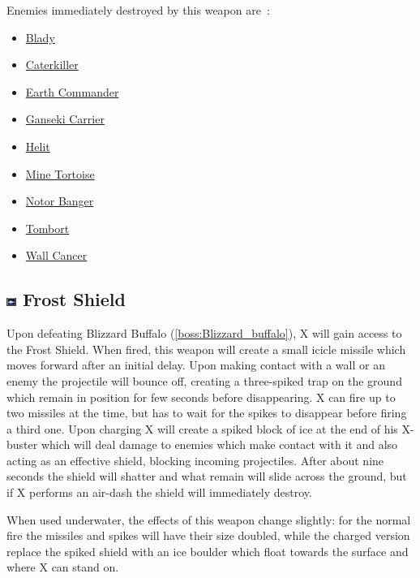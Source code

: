 Enemies immediately destroyed by this weapon are~\cite{wiki:damage_chart_X3}:
\begin{itemize}
	\item \hyperlink{enem:Blady}{Blady}
	\item \hyperlink{enem:Caterkiller}{Caterkiller}
	\item \hyperlink{enem:Earth_Commander}{Earth Commander}
	\item \hyperlink{enem:Ganseki_Carrier}{Ganseki Carrier}
	\item \hyperlink{enem:Helit}{Helit}
	\item \hyperlink{enem:Mine_Tortoise}{Mine Tortoise}
	\item \hyperlink{enem:Notor_Banger}{Notor Banger}
	\item \hyperlink{enem:Tombort}{Tombort}
	\item \hyperlink{enem:Wall_Cancer}{Wall Cancer}
\end{itemize}
\subsection{\includegraphics[width=12px, height=10px]{figures/X3/weapons/F_shield.jpg} Frost Shield}\label{Frost_Shield}
Upon defeating Blizzard Buffalo (\ref{boss:Blizzard_buffalo}), X will gain access to the Frost Shield. When fired, this weapon will create a small icicle missile which moves forward after an initial delay. Upon making contact with a wall or an enemy the projectile will bounce off, creating a three-spiked trap on the ground which remain in position for few seconds before disappearing. X can fire up to two missiles at the time, but has to wait for the spikes to disappear before firing a third one. Upon charging X will create a spiked block of ice at the end of his X-buster which will deal damage to enemies which make contact with it and also acting as an effective shield, blocking incoming projectiles. After about nine seconds the shield will shatter and what remain will slide across the ground, but if X performs an air-dash the shield will immediately destroy.

When used underwater, the effects of this weapon change slightly: for the normal fire the missiles and spikes will have their size doubled, while the charged version replace the spiked shield with an ice boulder which float towards the surface and where X can stand on.

